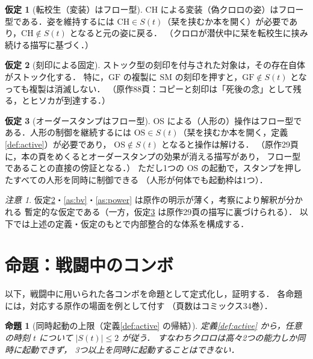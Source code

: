 \documentclass[a4paper,12pt]{jarticle}
\theoremstyle{definition}
\newtheorem{assumption}{仮定}
\theoremstyle{plain}
\newtheorem{prop}{命題}
\theoremstyle{definition}
\theoremstyle{remark}
\newtheorem*{remark}{注意}
\newcommand{\Act}{S}   %
\newcommand{\GF}{\mathrm{GF}}    %
\newcommand{\OS}{\mathrm{OS}}    %
\newcommand{\CH}{\mathrm{CH}}    %
\newcommand{\SM}{\mathrm{SM}}    %
\begin{document}
\begin{assumption}[転校生（変装）はフロー型]\label{as:ch}
CH による変装（偽クロロの姿）はフロー型である．姿を維持するには
$\CH\in\Act(t)$（栞を挟むか本を開く）が必要であり，$\CH\notin\Act(t)$ となると元の姿に戻る．
（クロロが潜伏中に栞を転校生に挟み続ける描写に基づく．）
\end{assumption}

\begin{assumption}[刻印による固定]\label{as:anchor}
ストック型の刻印を付与された対象は，その存在自体がストック化する．
特に，$\GF$ の複製に $\SM$ の刻印を押すと，$\GF\notin\Act(t)$ となっても複製は消滅しない．
（原作88頁：コピーと刻印は「死後の念」として残る，とヒソカが到達する．）
\end{assumption}

\begin{assumption}[オーダースタンプはフロー型]\label{as:agent}
OS による（人形の）操作はフロー型である．人形の制御を継続するには
$\OS\in\Act(t)$（栞を挟むか本を開く，定義\ref{def:active}）が必要であり，
$\OS\notin\Act(t)$ となると操作は解ける．
（原作29頁に，本の頁をめくるとオーダースタンプの効果が消える描写があり，
フロー型であることの直接の傍証となる．）
ただし1つの $\OS$ の起動で，スタンプを押したすべての人形を同時に制御できる
（人形が何体でも起動枠は1つ）．
\end{assumption}

\begin{remark}
仮定\ref{as:anchor}・\ref{as:bv}・\ref{as:power} は原作の明示が薄く，考察により解釈が分かれる
暫定的な仮定である（一方，仮定\ref{as:agent} は原作29頁の描写に裏づけられる）．
以下では上述の定義・仮定のもとで内部整合的な体系を構成する．
\end{remark}

\section{命題：戦闘中のコンボ}

以下，戦闘中に用いられた各コンボを命題として定式化し，証明する．
各命題には，対応する原作の場面を例として付す
（頁数はコミックス34巻）．

\begin{prop}[同時起動の上限（定義\ref{def:active} の帰結）]\label{prop:two}
定義\ref{def:active} から，任意の時刻 $t$ について $|\Act(t)|\le 2$ が従う．
すなわちクロロは高々2つの能力しか同時に起動できず，
3つ以上を同時に起動することはできない．
\end{prop}
\end{document}
